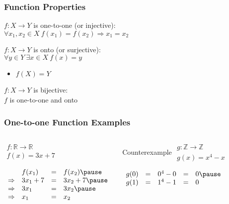 \documentclass[dvipsnames]{beamer}
\begin{document}
\begin{frame}
  \frametitle{Function Properties}

  \begin{definition}
    $f: X \rightarrow Y$ is \alert{one-to-one} (or \alert{injective}):\\
      $\forall x_1,x_2 \in X~f(x_1)=f(x_2) \Rightarrow x_1=x_2$
  \end{definition}

  \pause
  \begin{definition}
    $f: X \rightarrow Y$ is \alert{onto} (or \alert{surjective}):\\
    $\forall y \in Y~\exists x \in X~f(x)=y$

    \begin{itemize}
      \item $f(X)=Y$
    \end{itemize}
  \end{definition}

  \pause
  \begin{definition}
    $f: X \rightarrow Y$ is \alert{bijective}:\\
    $f$ is one-to-one and onto
  \end{definition}
\end{frame}

\begin{frame}
  \frametitle{One-to-one Function Examples}

  \begin{columns}[t]
    \begin{example}
      $\begin{array}{l}
        f: \mathbb{R} \rightarrow \mathbb{R}\\
        f(x) = 3x + 7
      \end{array}$

      \pause
      \bigskip
      $\begin{array}{llll}
                    & f(x_1)    & = & f(x_2)\pause\\
        \Rightarrow & 3 x_1 + 7 & = & 3 x_2 + 7\pause\\
        \Rightarrow & 3 x_1     & = & 3 x_2\pause\\
        \Rightarrow & x_1       & = & x_2
      \end{array}$
    \end{example}

    \pause
    \begin{block}{Counterexample}
      $\begin{array}{l}
        g: \mathbb{Z} \rightarrow \mathbb{Z}\\
        g(x) = x^4 - x
      \end{array}$

      \pause
      \bigskip
      $\begin{array}{lllll}
        g(0) & = & 0^4 - 0 & = & 0\pause\\
        g(1) & = & 1^4 - 1 & = & 0
      \end{array}$
    \end{block}
  \end{columns}
\end{frame}
\end{document}
